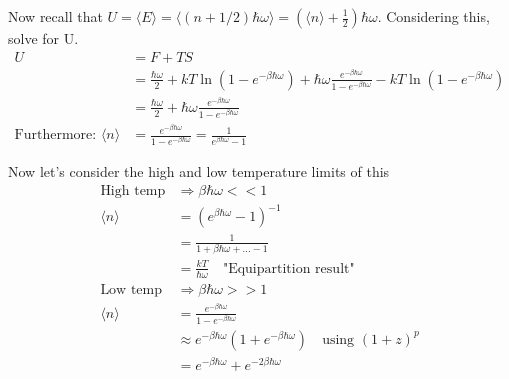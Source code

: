 \documentclass[a4paper, 11pt]{article}
\begin{document}
\noindent Now recall that $U = \langle E \rangle = \langle(n+1/2)\hbar\omega\rangle =(\langle n\rangle + \frac{1}{2})\hbar\omega$. Considering this, solve for U. 
	\begin{align*}
		U 	&= F + TS \\ 
			&= \frac{\hbar\omega}{2}+kT\ln(1-e^{-\beta\hbar\omega}) + \hbar\omega\frac{e^{-\beta\hbar\omega}}{1-e^{-\beta\hbar\omega}}-kT\ln(1-e^{-\beta\hbar\omega}) \\ 
			&= \frac{\hbar\omega}{2}+\hbar\omega\frac{e^{-\beta\hbar\omega}}{1-e^{-\beta\hbar\omega}} \\ 
		\text{Furthermore: } \langle n \rangle &= \frac{e^{-\beta\hbar\omega}}{1-e^{-\beta\hbar\omega}} = \frac{1}{e^{\beta\hbar\omega}-1}
	\end{align*}
	
\noindent Now let's consider the high and low temperature limits of this
	\begin{align*}
		\text{High temp} &\Rightarrow \beta\hbar\omega << 1 \\ 
		\langle n \rangle &= (e^{\beta\hbar\omega}-1)^{-1} \\ 
			&= \frac{1}{1+\beta\hbar\omega + ... - 1} \\ 
			&= \frac{kT}{\hbar\omega}\quad \text{"Equipartition result"}\\
		\text{Low temp} &\Rightarrow \beta\hbar\omega >> 1 \\ 
		\langle n \rangle &= \frac{e^{-\beta\hbar\omega}}{1-e^{-\beta\hbar\omega}} \\ 
			&\approx e^{-\beta\hbar\omega}(1+e^{-\beta\hbar\omega}) \quad \text{using } (1+z)^p \\ 
			&= e^{-\beta\hbar\omega}+e^{-2\beta\hbar\omega}
	\end{align*}
	
	
	
	
	
	
	
	
	
	
	
	
	
	
	
	
	
	
	
\end{document}
